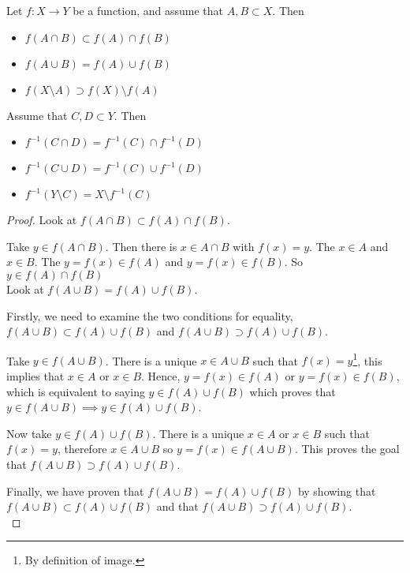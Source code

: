 \documentclass[10pt, a4paper]{article}
\begin{document}
\begin{proposition}
    Let $f : X \rightarrow Y$ be a function, and assume that $A, B \subset X$. Then
    \begin{itemize}
        \item $f(A \cap B) \subset f(A) \cap f(B)$
        \item $f(A \cup B) = f(A) \cup f(B)$
        \item $f(X \setminus A) \supset f(X) \setminus f(A)$
    \end{itemize}
    Assume that $C, D \subset Y$. Then
    \begin{itemize}
        \item $f ^ {-1}(C \cap D) = f^{-1}(C) \cap f^{-1}(D)$
        \item $f^{-1}(C \cup D) = f^{-1}(C) \cup f^{-1}(D)$
        \item $f^{-1}(Y \setminus C) = X \setminus f^{-1}(C)$
    \end{itemize}

    \begin{proof}
        Look at $f(A \cap B) \subset f(A) \cap f(B)$.
        
        Take $y \in f(A \cap B)$. Then there is $x \in A \cap B$ with $f(x) = y$.
        The $x \in A$ and $x \in B$. The $y = f(x) \in f(A)$ and $y = f(x) \in f(B)$.
        So $y \in f(A) \cap f(B)$ \\

        Look at $f(A \cup B) = f(A) \cup f(B)$.

        Firstly, we need to examine the two conditions for equality, $f(A \cup B) \subset f(A) \cup f(B)$ and $f(A \cup B) \supset f(A) \cup f(B)$.
        
        Take $y \in f(A \cup B)$. There is a unique $x \in A \cup B$ such that $f(x) = y$\footnote{By definition of image.}, this implies that $x \in A$ or $x \in B$. Hence, $y = f(x) \in f(A)$ or $y = f(x) \in f(B)$, which is equivalent to saying $y \in f(A) \cup f(B)$ which proves that $y \in f(A \cup B) \implies y \in f(A) \cup f(B)$.

        Now take $y \in f(A) \cup f(B)$. There is a unique $x \in A$ or $x \in B$ such that $f(x) = y$, therefore $x \in A \cup B$ so $y = f(x) \in f(A \cup B)$. This proves the goal that $f(A \cup B) \supset f(A) \cup f(B)$.

        Finally, we have proven that $f(A \cup B) = f(A) \cup f(B)$ by showing that $f(A \cup B) \subset f(A) \cup f(B)$ and that $f(A \cup B) \supset f(A) \cup f(B)$. \\


\end{proof}
\end{proposition}
\end{document}
